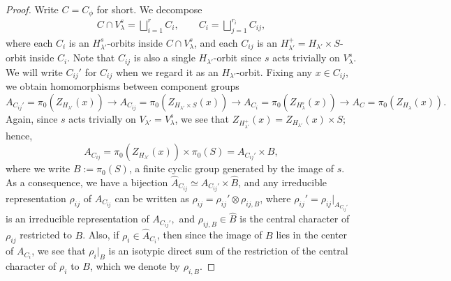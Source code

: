\documentclass[11pt,letterpaper]{amsart}
\numberwithin{equation}{section}
\begin{document}
\begin{proof}
Write $C=C_{\phi}$ for short. 
We decompose 
\begin{align}\label{eq lift=trans decomp of orbit}
    C\cap V_{\lambda}^{s }=  \bigsqcup_{i=1}^r C_i,\qquad C_i= \bigsqcup_{j=1}^{r_i} C_{ij},
\end{align}
where each $C_i$ is an 
$H_{\lambda'}^{s}$-orbits inside $C\cap V_{\lambda}^{s}$, and each $C_{ij}$ is an $H_{\lambda'}^+=H_{\lambda'} \times S$-orbit inside $C_i$. 
Note that $C_{ij}$ is also a single $H_{\lambda'}$-orbit since $s$ acts trivially on $V_{\lambda}^{s}$. 
We will write $C_{ij}'$ for $C_{ij}$ when we regard it as an $H_{\lambda'}$-orbit.
Fixing any $x \in C_{ij}$, we obtain homomorphisms between component groups
\[ 
A_{C_{ij}'}=  \pi_0(Z_{H_{\lambda'}} (x)) \to A_{C_{ij}}= \pi_0(Z_{H_{\lambda'} \times S}(x)) \to A_{C_i}=\pi_0(Z_{H_{\lambda}^{s} }(x)) \to A_{C}=\pi_0(Z_{H_{\lambda} }(x)). \]
Again, since $s$ acts trivially on $V_{\lambda'}= V_{\lambda}^{s}$, we see that $Z_{H_{\lambda'}^+}(x)= Z_{H_{\lambda'}}(x) \times S$; hence,
\[ A_{C_{ij}}= \pi_0(Z_{H_{\lambda'}}(x)) \times \pi_0(S)= A_{C_{ij}'} \times B, \]
where we write $B:= \pi_0(S)$, a finite cyclic group generated by the image of $s$. 
As a consequence, we have a bijection $\widehat{A}_{C_{ij}} \simeq \widehat{A}_{C_{ij}'} \times \widehat{B}$, and any irreducible representation $\rho_{ij}$ of $A_{C_{ij}}$ can be written as $\rho_{ij}= \rho_{ij}' \otimes \rho_{ij,B}$, where $\rho_{ij}'= \rho_{ij}|_{A_{C_{ij}'}}$ is an irreducible representation of $A_{C_{ij}'},$ and $\rho_{ij,B} \in \widehat{B}$ is the central character of $\rho_{ij}$ restricted to $B$. Also, if $\rho_{i} \in \widehat{A}_{C_i}$, then since the image of $B$ lies in the center of $A_{C_i}$, we see that $\rho_i|_{B}$ is an isotypic direct sum of the restriction of the central character of $\rho_i$ to $B$, which we denote by $\rho_{i,B}$.



\end{proof}
\end{document}
